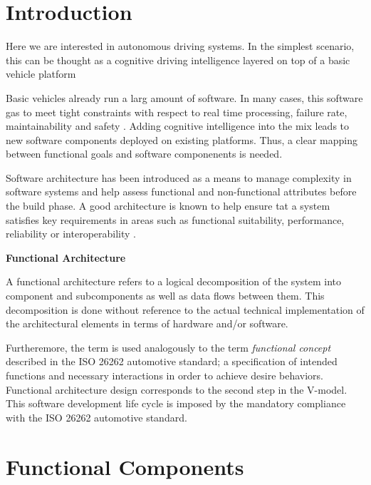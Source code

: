 \section{Introduction}
\label{introduction}

Here we are interested in autonomous driving systems. In the simplest scenario, this can be thought as a cognitive driving intelligence layered on top of a basic vehicle platform

Basic vehicles already run a larg amount of software. In many cases, this software gas to meet tight constraints with respect to real time processing,
failure rate, maintainability and safety \cite{Serban}. Adding cognitive intelligence into the mix leads to new software components deployed on existing platforms.
Thus, a clear mapping between functional goals and software componenents is needed. 

Software architecture has been introduced  as a means to manage complexity in software systems and help assess functional and non-functional attributes before the 
build phase. A good architecture is known to help ensure tat a system satisfies key requirements in areas such as functional suitability, performance,
reliability or interoperability \cite{Garlan2000}. 


\begin{framed}
\theoremstyle{remark}
\begin{remark}{\textbf{Functional Architecture}}

A functional architecture refers to a logical decomposition of the system into component and subcomponents as well as data flows between them.  
This decomposition is done without reference to the actual technical implementation of the architectural elements in terms of hardware and/or software.

Furtheremore, the term is used analogously to the term {\em functional concept} described in the ISO 26262 automotive standard; a specification
of intended functions and necessary interactions in order to achieve desire behaviors. Functional architecture design corresponds to the second
step in the V-model. This software development life cycle is imposed by the mandatory compliance with the ISO 26262 automotive standard.

\end{remark}
\end{framed}



\section{Functional Components}


